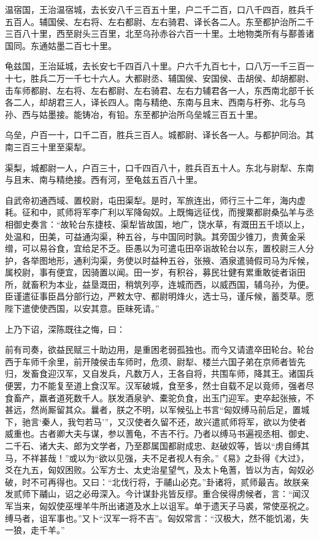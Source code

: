 \documentclass[]{article}
\begin{document}
温宿国，王治温宿城，去长安八千三百五十里，户二千二百，口八千四百，胜兵千五百人。辅国侯、左右将、左右都尉、左右骑君、译长各二人。东至都护治所二千三百八十里，西至尉头三百里，北至乌孙赤谷六百一十里。土地物类所有与鄯善诸国同。东通姑墨二百七十里。

龟兹国，王治延城，去长安七千四百八十里。户六千九百七十，口八万一千三百一十七，胜兵二万一千七十六人。大都尉丞、辅国侯、安国侯、击胡侯、却胡都尉、击车师都尉、左右将、左右都尉、左右骑君、左右力辅君各一人，东西南北部千长各二人，却胡君三人，译长四人。南与精绝、东南与且末、西南与杅弥、北与乌孙、西与姑墨接。能铸冶，有铅。东至都护治所乌垒城三百五十里。

乌垒，户百一十，口千二百，胜兵三百人。城都尉、译长各一人。与都护同治。其南三百三十里至渠犁。

渠梨，城都尉一人，户百三十，口千四百八十，胜兵百五十人。东北与尉犁、东南与且末、南与精绝接。西有河，至龟兹五百八十里。

自武帝初通西域、置校尉，屯田渠犁。是时，军旅连出，师行三十二年，海内虚耗。征和中，贰师将军李广利以军降匈奴。上既悔远征伐，而搜粟都尉桑弘羊与丞相御史奏言：``故轮台东捷枝、渠犁皆故国，地广，饶水草，有溉田五千顷以上，处温和，田美，可益通沟渠，种五谷，与中国同时孰。其旁国少锥刀，贵黄金采缯，可以易谷食，宜给足不乏。臣愚以为可遣屯田卒诣故轮台以东，置校尉三人分护，各举图地形，通利沟渠，务使以时益种五谷，张掖、酒泉遣骑假司马为斥候，属校尉，事有便宜，因骑置以闻。田一岁，有积谷，募民壮健有累重敢徙者诣田所，就畜积为本业，益垦溉田，稍筑列亭，连城而西，以威西国，辅乌孙，为便。臣谨遣征事臣昌分部行边，严敕太守、都尉明烽火，选士马，谨斥候，蓄茭草。愿陛下遣使使西国，以安其意。臣昧死请。''

上乃下诏，深陈既往之悔，曰：

前有司奏，欲益民赋三十助边用，是重困老弱孤独也。而今又请遣卒田轮台。轮台西于车师千余里，前开陵侯击车师时，危须、尉犁、楼兰六国子弟在京师者皆先归，发畜食迎汉军，又自发兵，凡数万人，王各自将，共围车师，降其王。诸国兵便罢，力不能复至道上食汉军。汉军破城，食至多，然士自载不足以竟师，强者尽食畜产，羸者道死数千人。朕发酒泉驴、橐驼负食，出玉门迎军。吏卒起张掖，不甚远，然尚厮留其众。曩者，朕之不明，以军候弘上书言``匈奴缚马前后足，置城下，驰言`秦人，我匄若马'''，又汉使者久留不还，故兴遣贰师将军，欲以为使者威重也。古者卿大夫与谋，参以蓍龟，不吉不行。乃者以缚马书遍视丞相、御史、二千石、诸大夫、郎为文学者，乃至郡属国都尉成忠、赵破奴等，皆以``虏自缚其马，不祥甚哉！''或以为``欲以见强，夫不足者视人有余。''《易》之卦得《大过》，爻在九五，匈奴困败。公军方士、太史治星望气，及太卜龟蓍，皆以为吉，匈奴必破，时不可再得也。又曰：``北伐行将，于鬴山必克。''卦诸将，贰师最吉。故朕亲发贰师下鬴山，诏之必毋深入。今计谋卦兆皆反缪。重合侯得虏候者，言：``闻汉军当来，匈奴使巫埋羊牛所出诸道及水上以诅军。单于遗天子马裘，常使巫祝之。缚马者，诅军事也。''又卜``汉军一将不吉''。匈奴常言：``汉极大，然不能饥渴，失一狼，走千羊。''
\end{document}
